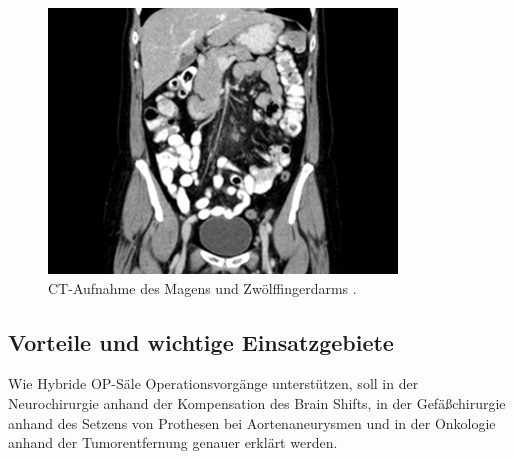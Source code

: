 \begin{figure}[!htb]
	\includegraphics[width=\linewidth]{Content/Pictures/mrtct.png}
	\caption{CT-Aufnahme des Magens und Zwölffingerdarms \cite{CTBild}.}
	\label{fig:mrtct}
	\endminipage
\end{figure}

\subsection{Vorteile und wichtige Einsatzgebiete}

Wie Hybride OP-Säle Operationsvorgänge unterstützen, soll in der Neurochirurgie anhand der Kompensation des Brain Shifts, in der Gefäßchirurgie anhand des Setzens von Prothesen bei Aortenaneurysmen und in der Onkologie anhand der Tumorentfernung genauer erklärt werden.

